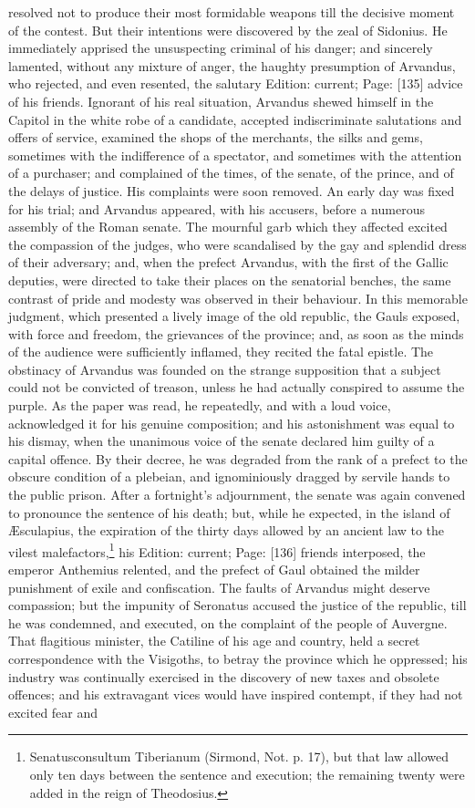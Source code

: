 resolved not to produce their most formidable weapons till the decisive moment of the contest. But their intentions were discovered by the zeal of Sidonius. He immediately apprised the unsuspecting criminal of his danger; and sincerely lamented, without any mixture of anger, the haughty presumption of Arvandus, who rejected, and even resented, the salutary Edition: current; Page: [135] advice of his friends. Ignorant of his real situation, Arvandus shewed himself in the Capitol in the white robe of a candidate, accepted indiscriminate salutations and offers of service, examined the shops of the merchants, the silks and gems, sometimes with the indifference of a spectator, and sometimes with the attention of a purchaser; and complained of the times, of the senate, of the prince, and of the delays of justice. His complaints were soon removed. An early day was fixed for his trial; and Arvandus appeared, with his accusers, before a numerous assembly of the Roman senate. The mournful garb which they affected excited the compassion of the judges, who were scandalised by the gay and splendid dress of their adversary; and, when the prefect Arvandus, with the first of the Gallic deputies, were directed to take their places on the senatorial benches, the same contrast of pride and modesty was observed in their behaviour. In this memorable judgment, which presented a lively image of the old republic, the Gauls exposed, with force and freedom, the grievances of the province; and, as soon as the minds of the audience were sufficiently inflamed, they recited the fatal epistle. The obstinacy of Arvandus was founded on the strange supposition that a subject could not be convicted of treason, unless he had actually conspired to assume the purple. As the paper was read, he repeatedly, and with a loud voice, acknowledged it for his genuine composition; and his astonishment was equal to his dismay, when the unanimous voice of the senate declared him guilty of a capital offence. By their decree, he was degraded from the rank of a prefect to the obscure condition of a plebeian, and ignominiously dragged by servile hands to the public prison. After a fortnight\texthebrew{}’s adjournment, the senate was again convened to pronounce the sentence of his death; but, while he expected, in the island of Æsculapius, the expiration of the thirty days allowed by an ancient law to the vilest malefactors,\footnote{Senatusconsultum Tiberianum (Sirmond, Not. p. 17), but that law allowed only ten days between the sentence and execution; the remaining twenty were added in the reign of Theodosius.} his Edition: current; Page: [136] friends interposed, the emperor Anthemius relented, and the prefect of Gaul obtained the milder punishment of exile and confiscation. The faults of Arvandus might deserve compassion; but the impunity of Seronatus accused the justice of the republic, till he was condemned, and executed, on the complaint of the people of Auvergne. That flagitious minister, the Catiline of his age and country, held a secret correspondence with the Visigoths, to betray the province which he oppressed; his industry was continually exercised in the discovery of new taxes and obsolete offences; and his extravagant vices would have inspired contempt, if they had not excited fear and 